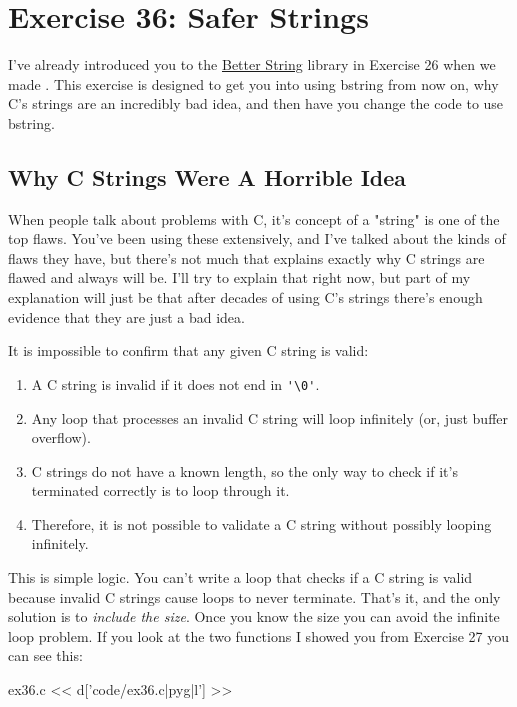 \chapter{Exercise 36: Safer Strings}

I've already introduced you to the \href{http://bstring.sourceforge.net/}{Better String} library in Exercise 26 when we made .  This exercise
is designed to get you into using bstring from now on, why C's strings are
an incredibly bad idea, and then have you change the  
code to use bstring.

\section{Why C Strings Were A Horrible Idea}

When people talk about problems with C, it's concept of a "string" is one of the top flaws.
You've been using these extensively, and I've talked about the kinds of flaws they have, but there's
not much that explains exactly why C strings are flawed and always will be.  I'll try to explain
that right now, but part of my explanation will just be that after decades of using C's strings
there's enough evidence that they are just a bad idea.

It is impossible to confirm that any given C string is valid:

\begin{enumerate}
\item A C string is invalid if it does not end in \verb|'\0'|.
\item Any loop that processes an invalid C string will loop infinitely (or, just buffer overflow).
\item C strings do not have a known length, so the only way to check if it's terminated correctly is to loop through it.
\item Therefore, it is not possible to validate a C string without possibly looping infinitely.
\end{enumerate}

This is simple logic.  You can't write a loop that checks if a C string is valid
because invalid C strings cause loops to never terminate.  That's it, and the
only solution is to \emph{include the size}.  Once you know the size you can
avoid the infinite loop problem.  If you look at the two functions I showed
you from Exercise 27 you can see this:

\begin{code}{ex36.c}
<< d['code/ex36.c|pyg|l'] >>
\end{code}

